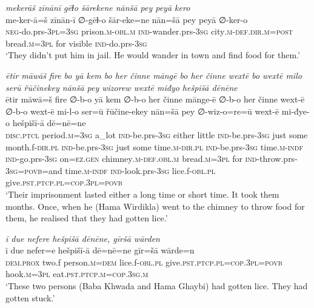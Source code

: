 \ea \label{BP.148}
\textit{mekerāš zīnānī gēɫo šārekene nānšā pey peyā kero} \\ 
\gll me-ker-ā=š zīnān-ī ∅-gēɫ-o šār-eke=ne nān=šā pey peyā ∅-ker-o \\ 
 \textsc{neg-}do.prs\textsc{-3pl}\textsc{=3sg} prison\textsc{.m}\textsc{-obl}\textsc{.m} \textsc{ind-}wander.prs\textsc{-3sg} city\textsc{.m}\textsc{-def}\textsc{.dir}\textsc{.m}\textsc{=\textsc{post}} bread\textsc{.m}\textsc{=3pl} for visible \textsc{ind-}do.prs\textsc{-3sg} \\ 
\glt `They didn’t put him in jail. He would wander in town and find food for them.'
\z 
 
\ea \label{BP.149}
\textit{ētir māwāš fire bo yā kem bo her činne māngē bo her činne wextē bo wextē milo serū řūčinekey nānšā pey wizorew wextē miđyo hešpišā dēnēne} \\ 
\gll ētir māwā=š fire ∅-b-o yā kem ∅-b-o her činne mānge-ē ∅-b-o her činne wext-ē ∅-b-o wext-ē mi-l-o ser=ū řūčine-ekey nān=šā pey ∅-wiz-o=re=ū wext-ē mi-đye-o hešpišī-ā dē=nē=ne \\ 
 \textsc{disc.ptcl} period\textsc{.m}\textsc{=3sg} a\_lot \textsc{ind-}be.prs\textsc{-3sg} either little \textsc{ind-}be.prs\textsc{-3sg} just some month.f\textsc{-dir}\textsc{.pl} \textsc{ind-}be.prs\textsc{-3sg} just some time\textsc{.m}\textsc{-dir}\textsc{.pl} \textsc{ind-}be.prs\textsc{-3sg} time\textsc{.m}\textsc{-indf} \textsc{ind-}go.prs\textsc{-3sg} on\textsc{=ez.gen} chimney\textsc{.m}\textsc{-def}\textsc{.obl}\textsc{.m} bread\textsc{.m}\textsc{=3pl} for \textsc{ind-}throw.prs\textsc{-3sg}\textsc{=\textsc{povb}}=and time\textsc{.m}\textsc{-indf} \textsc{ind-}look.prs\textsc{-3sg} lice.f\textsc{-obl}\textsc{.pl} give\textsc{.pst}\textsc{.ptcp}\textsc{.pl}\textsc{=cop}\textsc{.3pl}\textsc{=\textsc{povb}} \\ 
\glt `Their imprisonment lasted either a long time or short time. It took them months. Once, when he (Hama Wirdikla) went to the chimney to throw food for them, he realised that they had gotten lice.'
\z 
 
\ea \label{BP.150}
\textit{ī due nefere hešpišā dēnēne, gīršā wārden} \\ 
\gll ī due nefer=e hešpišī-ā dē=nē=ne gīr=šā wārde=n \\ 
 \textsc{dem.prox} two.f person\textsc{.m}\textsc{=dem} lice.f\textsc{-obl}\textsc{.pl} give\textsc{.pst}\textsc{.ptcp}\textsc{.pl}\textsc{=cop}\textsc{.3pl}\textsc{=\textsc{povb}} hook\textsc{.m}\textsc{=3pl} eat\textsc{.pst}\textsc{.ptcp}\textsc{.m}\textsc{=cop}\textsc{.3sg}\textsc{.m} \\ 
\glt `These two persons (Baba Khwada and Hama Ghaybi) had gotten lice. They had gotten stuck.'
\z 
 
